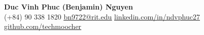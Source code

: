 \documentclass[letterpaper, 12pt]{article}
\begin{document}
\begin{center}
    \large {\textbf{Duc Vinh Phuc (Benjamin) Nguyen}} \\ \vspace{2.0pt}
    \small (+84) 90 338 1820 \;\textbullet\;
    \href{mailto:x@x.com}{\underline{bn9722@rit.edu}} \;\textbullet\; 
    \href{https://linkedin.com/in/...}{\underline{linkedin.com/in/ndvphuc27}} \;\textbullet\;
    \href{https://github.com/...}{\underline{github.com/techmoocher}}
\end{center}
\end{document}
